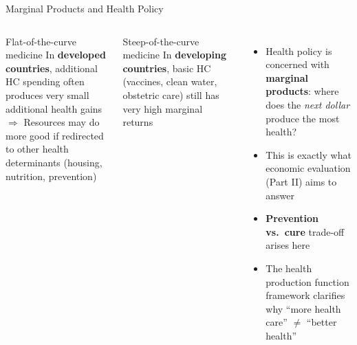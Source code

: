 \documentclass[aspectratio=169, 12pt]{beamer}
\begin{document}
\begin{frame}{Marginal Products and Health Policy}
  \begin{columns}
      \begin{block}{Flat-of-the-curve medicine}
        In \textbf{developed countries}, additional HC spending often produces very small
        additional health gains\\[0.3em]
        $\Rightarrow$ Resources may do more good if redirected to other health determinants
        (housing, nutrition, prevention)
      \end{block}
      \vspace{0.4em}
      \begin{alertblock}{Steep-of-the-curve medicine}
        In \textbf{developing countries}, basic HC (vaccines, clean water, obstetric care) still
        has very high marginal returns
      \end{alertblock}
      \begin{itemize}
        \item Health policy is concerned with \textbf{marginal products}: where does the
              \emph{next dollar} produce the most health?
        \item This is exactly what economic evaluation (Part II) aims to answer
        \item \textbf{Prevention vs.\ cure} trade-off arises here
        \item The health production function framework clarifies why ``more health care''
              $\neq$ ``better health''
      \end{itemize}
  \end{columns}
\end{frame}
\end{document}
